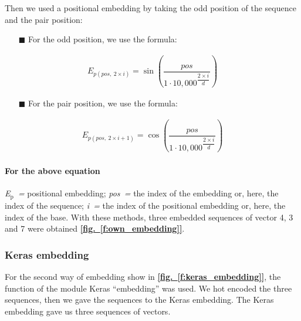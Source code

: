 \documentclass[12pt, oneside, a4paper]{report}
\newcommand{\fref}[1]{\hyperref[#1]{\textbf{[fig.~\ref*{#1}]}}}
\newcommand{\id}[1]{$_\text{#1}$}
\newcommand{\C}{\tiny$\blacksquare$}
\newenvironment{matheq}{
    \begin{equation*}
        \begin{array}{rcl}
}{
        \end{array}
    \end{equation*}
}
\begin{document}
\begin{multicols}{2}
Then we used a positional embedding by taking the odd position of the sequence and the pair position:
\begin{itemize}
    \item[\C] For the odd position, we use the formula:
\end{itemize}

\begin{matheq}
    E_{p(pos, ~2 \times i)} = \sin\left(\dfrac{pos}{1 \cdot 10,000^{\dfrac{2 \times i}{d}}} \right)
\end{matheq}
    
\begin{itemize}    
    \item[\C] For the pair position, we use the formula:
\end{itemize}

\begin{matheq}
    E_{p(pos, ~2 \times i + 1)} = \cos\left(\dfrac{pos}{1 \cdot 10,000^{\dfrac{2 \times i}{d}}} \right)
\end{matheq}

\paragraph{For the above equation} \textit{E\id{p}~=} positional embedding; \textit{pos~=} the index of the embedding or, here, the index of the sequence; \textit{i~=} the index of the positional embedding or, here, the index of the base. 
With these methods, three embedded sequences of vector 4, 3 and 7 were obtained \fref{f:own_embedding}.

\subsubsection{Keras embedding}
For the second way of embedding show in \fref{f:keras_embedding}, the function of the module Keras ``embedding'' was used. We hot encoded the three sequences, then we gave the sequences to the Keras embedding. The Keras embedding gave us three sequences of vectors.


\end{multicols}
\end{document}
